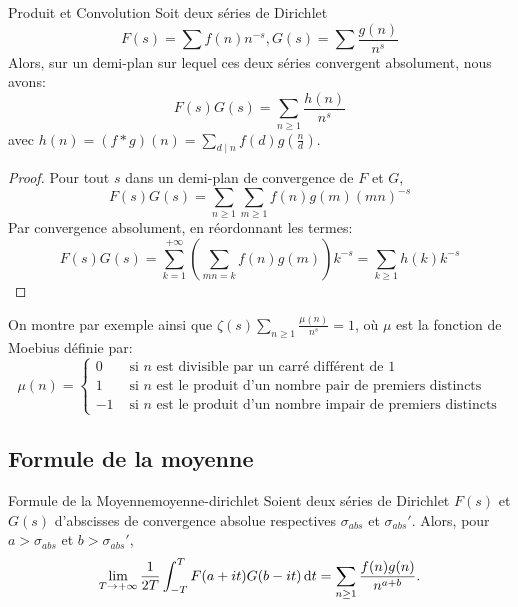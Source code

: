 \documentclass{cours}
\begin{document}
\begin{théorème}
	{Produit et Convolution}{}
	Soit deux séries de Dirichlet
	\begin{equation*}
		F(s) = \sum f(n)n^{-s}, G(s) = \sum \frac{g(n)}{n^{s}}
	\end{equation*}
	Alors, sur un demi-plan sur lequel ces deux séries convergent absolument, nous avons: 
	\begin{equation*}
		F(s)G(s) = \sum_{n \geq 1}\frac{h(n)}{n^{s}}
	\end{equation*}
	avec $h(n) = (f*g)(n) = \sum_{d \mid n}f(d)g(\frac{n}{d})$.
\end{théorème}
\begin{proof}
	Pour tout $s$ dans un demi-plan de convergence de $F$ et $G$, 
	\begin{equation*}
		F(s)G(s) = \sum_{n\geq 1}\sum_{m\geq 1}f(n)g(m)(mn)^{-s}
	\end{equation*}
	Par convergence absolument, en réordonnant les termes: 
	\begin{equation*}
		F(s) G(s) = \sum_{k = 1}^{+\infty}\left(\sum_{mn = k}f(n)g(m)\right)k^{-s} = \sum_{k \geq 1}h(k)k^{-s}
	\end{equation*}
\end{proof}

On montre par exemple ainsi que $\zeta(s)\sum_{n \geq 1}\frac{\mu(n)}{n^{s}} = 1$, où $\mu$ est la fonction de Moebius définie par: 
\begin{equation*}
	\mu(n) = \begin{cases}
		0 & \text{ si } n \text{ est divisible par un carré différent de } 1\\
		1 & \text{ si } n \text{ est le produit d'un nombre pair de premiers distincts} \\
		-1 & \text{ si } n \text{ est le produit d'un nombre impair de premiers distincts}
	\end{cases}
\end{equation*}

\subsection{Formule de la moyenne}
\begin{théorème}
	{Formule de la Moyenne}{moyenne-dirichlet}
	Soient deux séries de Dirichlet $F(s)$ et $G(s)$ d'abscisses de convergence absolue respectives $\sigma_{abs}$ et $\sigma_{abs}'$. Alors, pour $a > \sigma_{abs}$ et $b > \sigma_{abs}'$, 
	\begin{equation*}
		\lim_{T \to +\infty}\frac{1}{2T}\int_{-T}^{T}F(a + it)G(b - it){\rm \, d} t = \sum_{n \geq 1}\frac{f(n)g(n)}{n^{a + b}}. 
	\end{equation*}
\end{théorème}
\end{document}
